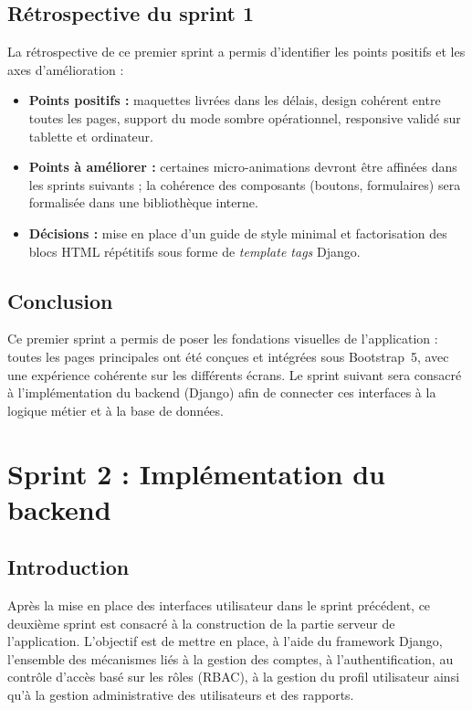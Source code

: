 \section{Rétrospective du sprint 1}
La rétrospective de ce premier sprint a permis d'identifier les points positifs et les
axes d'amélioration :
\begin{itemize}
\item \textbf{Points positifs :} maquettes livrées dans les délais, design cohérent
entre toutes les pages, support du mode sombre opérationnel, responsive validé sur
tablette et ordinateur.
\item \textbf{Points à améliorer :} certaines micro-animations devront être affinées
dans les sprints suivants ; la cohérence des composants (boutons, formulaires) sera
formalisée dans une bibliothèque interne.
\item \textbf{Décisions :} mise en place d'un guide de style minimal et factorisation
des blocs HTML répétitifs sous forme de \emph{template tags} Django.
\end{itemize}

\section*{Conclusion}
Ce premier sprint a permis de poser les fondations visuelles de l'application : toutes
les pages principales ont été conçues et intégrées sous Bootstrap~5, avec une
expérience cohérente sur les différents écrans. Le sprint suivant sera consacré à
l'implémentation du backend (Django) afin de connecter ces interfaces à la logique
métier et à la base de données.


\chapter{Sprint 2 : Implémentation du backend}

\section*{Introduction}
Après la mise en place des interfaces utilisateur dans le sprint précédent, ce
deuxième sprint est consacré à la construction de la partie serveur de l'application.
L'objectif est de mettre en place, à l'aide du framework Django, l'ensemble des
mécanismes liés à la gestion des comptes, à l'authentification, au contrôle d'accès
basé sur les rôles (RBAC), à la gestion du profil utilisateur ainsi qu'à la gestion
administrative des utilisateurs et des rapports.

